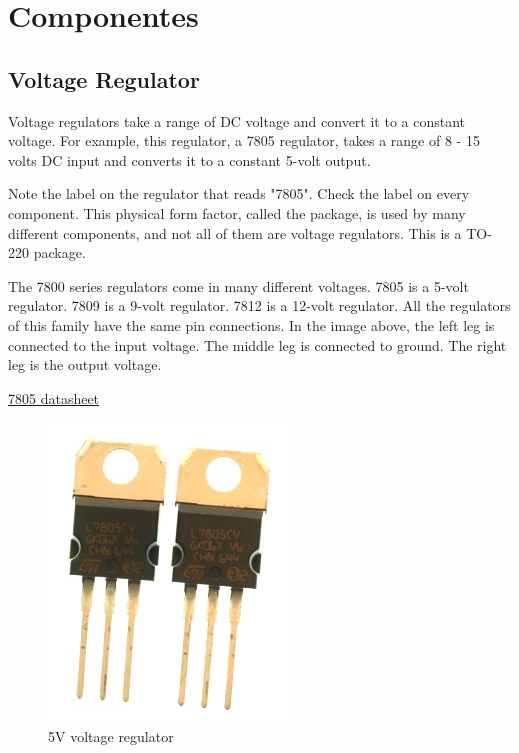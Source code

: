 \chapter{Componentes}

\section{Voltage Regulator}

Voltage regulators take a range of DC voltage and convert it to a constant voltage. For example, this regulator, a 7805 regulator, takes a range of 8 - 15 volts DC input and converts it to a constant 5-volt output.

Note the label on the regulator that reads "7805". Check the label on every component. This physical form factor, called the package, is used by many different components, and not all of them are voltage regulators. This is a TO-220 package.

The 7800 series regulators come in many different voltages. 7805 is a 5-volt regulator. 7809 is a 9-volt regulator. 7812 is a 12-volt regulator. All the regulators of this family have the same pin connections. In the image above, the left leg is connected to the input voltage. The middle leg is connected to ground. The right leg is the output voltage.

\href{http://www.national.com/ds.cgi/LM/LM341.pdf}{7805 datasheet}

\begin{figure}[!htb]
     \centering
     \includegraphics[scale=0.3]{img/components/v_reg_7805.jpg}
     \caption{5V voltage regulator}
     \label{5V voltage regulator}
\end{figure}

